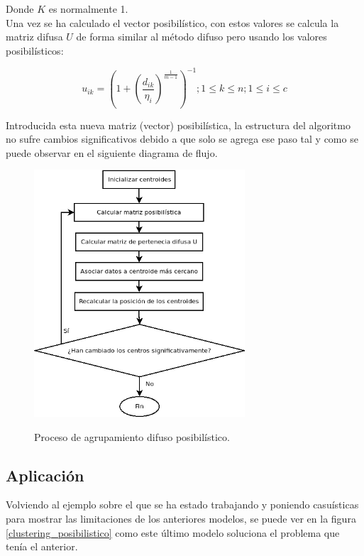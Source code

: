 \documentclass[]{report}
\begin{document}
		Donde $K$ es normalmente 1.\\
		
		Una vez se ha calculado el vector posibilístico, con estos valores se calcula la matriz difusa $U$ de forma similar al método difuso pero usando los valores posibilísticos:
		
		$$u_{ik} = (1+(\frac{d _{ik}}{\eta_i})^{\frac{1}{m-1}})^{-1} ; 1 \leq k \leq n; 1\leq i \leq c $$
		
		Introducida esta nueva matriz (vector) posibilística, la estructura del algoritmo no sufre cambios significativos debido a que solo se agrega ese paso tal y como se puede observar en el siguiente diagrama de flujo.
		
		\begin{figure}[h]
			\centering
			\includegraphics[width=0.7\textwidth]{agrupamiento-posibilistico.png}
			\label{agrupamiento_posibilistico}
			\caption{Proceso de agrupamiento difuso posibilístico.}
		\end{figure}
		
		\subsection{Aplicación}
			
			Volviendo al ejemplo sobre el que se ha estado trabajando y poniendo casuísticas para mostrar las limitaciones de los anteriores modelos, se puede ver en la figura \ref{clustering_posibilistico} como este último modelo soluciona el problema que tenía el anterior.
			
\end{document}
